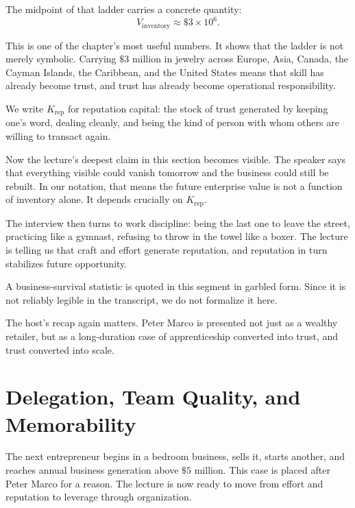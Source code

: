 The midpoint of that ladder carries a concrete quantity:
\begin{equation}
V_{\mathrm{inventory}} \approx \$3\times 10^6.
\end{equation}

This is one of the chapter's most useful numbers. It shows that the ladder is not merely symbolic. Carrying \(\$3\) million in jewelry across Europe, Asia, Canada, the Cayman Islands, the Caribbean, and the United States means that skill has already become trust, and trust has already become operational responsibility.

\begin{definition}
We write \(K_{\mathrm{rep}}\) for reputation capital: the stock of trust generated by keeping one's word, dealing cleanly, and being the kind of person with whom others are willing to transact again.
\end{definition}

Now the lecture's deepest claim in this section becomes visible. The speaker says that everything visible could vanish tomorrow and the business could still be rebuilt. In our notation, that means the future enterprise value is not a function of inventory alone. It depends crucially on \(K_{\mathrm{rep}}\).

The interview then turns to work discipline: being the last one to leave the street, practicing like a gymnast, refusing to throw in the towel like a boxer. The lecture is telling us that craft and effort generate reputation, and reputation in turn stabilizes future opportunity.

\begin{remark}
A business-survival statistic is quoted in this segment in garbled form. Since it is not reliably legible in the transcript, we do not formalize it here.
\end{remark}

The host's recap again matters. Peter Marco is presented not just as a wealthy retailer, but as a long-duration case of apprenticeship converted into trust, and trust converted into scale.

\section{Delegation, Team Quality, and Memorability}

The next entrepreneur begins in a bedroom business, sells it, starts another, and reaches annual business generation above \(\$5\) million. This case is placed after Peter Marco for a reason. The lecture is now ready to move from effort and reputation to leverage through organization.

